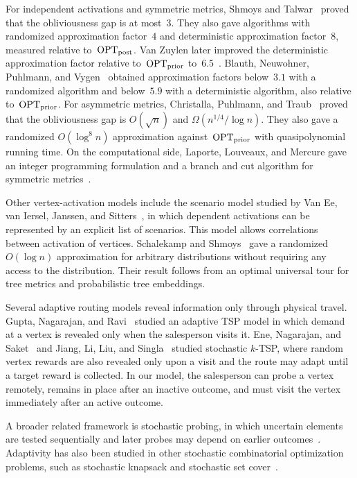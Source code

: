 \documentclass[12pt,a4paper,oneside]{report}
\begin{document}
For independent activations and symmetric metrics, Shmoys and
Talwar~\cite{Shmoys2008} proved that the
obliviousness gap is at most~$3$. They also gave algorithms with randomized
approximation factor~$4$ and deterministic approximation factor~$8$, measured
relative to~$\operatorname{OPT}_\mathrm{post}$. Van Zuylen later improved the deterministic
approximation factor relative to~$\operatorname{OPT}_\mathrm{prior}$ to~$6.5$~\cite{vanZuylen2011}.
Blauth, Neuwohner, Puhlmann, and Vygen~\cite{Blauth2024} obtained approximation
factors below~$3.1$ with a randomized algorithm and below~$5.9$ with a
deterministic algorithm, also relative to~$\operatorname{OPT}_\mathrm{prior}$.
For asymmetric metrics, Christalla, Puhlmann, and Traub~\cite{Christalla2025}
proved that the obliviousness gap is
$O(\sqrt n)$ and $\Omega(n^{1/4}/\log n)$. They also gave a randomized
$O(\log^8 n)$ approximation against~$\operatorname{OPT}_\mathrm{prior}$ with quasipolynomial running
time.
On the computational side, Laporte, Louveaux, and Mercure gave an
integer programming formulation and a branch and cut
algorithm for symmetric metrics~\cite{LaporteLouveauxMercure1994}.

Other vertex-activation models include the scenario model studied by Van Ee,
van Iersel, Janssen, and Sitters~\cite{vanEeIerselJanssenSitters2018}, in which
dependent activations can be represented by an explicit list of scenarios.
This model allows correlations between activation of vertices.
Schalekamp and Shmoys~\cite{SchalekampShmoys2008} gave a randomized
$O(\log n)$ approximation for arbitrary distributions without requiring any
access to the distribution. Their result follows from an optimal universal
tour for tree metrics and probabilistic tree embeddings.

Several adaptive routing models reveal information only through physical
travel. Gupta, Nagarajan, and Ravi~\cite{GuptaNagarajanRavi2017} studied an
adaptive TSP model in which demand at a vertex is revealed only when the
salesperson visits it. Ene, Nagarajan, and Saket~\cite{EneNagarajanSaket2017}
and Jiang, Li, Liu, and Singla~\cite{JiangLiLiuSingla2020} studied stochastic
$k$-TSP, where random vertex rewards are also revealed only upon a visit and
the route may adapt until a target reward is collected. In our model, the
salesperson can probe a vertex remotely, remains in place after an inactive
outcome, and must visit the vertex immediately after an active outcome.

A broader related framework is stochastic probing, in which uncertain
elements are tested sequentially and later probes may depend on earlier
outcomes~\cite{GuptaNagarajan2013}. 
Adaptivity has also been studied in other stochastic combinatorial
optimization problems, such as stochastic knapsack and stochastic set
cover~\cite{DeanGoemansVondrak2008,LV14,GoemansVondrak2006}.
\end{document}

